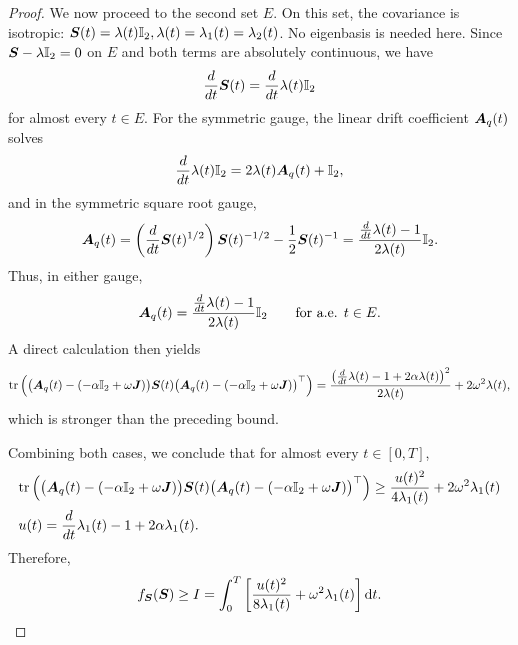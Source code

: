 \begin{proof}
We now proceed to the second set $E$. On this set, the covariance is isotropic: $\boldsymbol{S}(t)=\lambda(t)\mathbb{I}_2, \lambda(t) =\lambda_1(t)=\lambda_2(t)$.
No eigenbasis is needed here. Since $\boldsymbol{S}-\lambda \mathbb{I}_2=0$ on $E$ and both terms are absolutely continuous, we have
\begin{equation*}
    \frac{d}{dt}\boldsymbol{S}(t)= \frac{d}{dt}\lambda(t)\mathbb{I}_2
\end{equation*}
for almost every $t\in E$. For the symmetric gauge, the linear drift coefficient $\boldsymbol{A}_q(t)$ solves
\begin{equation*}
    \frac{d}{dt}\lambda(t)\mathbb{I}_2 = 2\lambda(t)\boldsymbol{A}_q(t)+\mathbb{I}_2,
\end{equation*}
and in the symmetric square root gauge,
\begin{equation*}
    \boldsymbol{A}_q(t)
    =
    \left(\frac{d}{dt}\boldsymbol{S}(t)^{1/2} \right)\boldsymbol{S}(t)^{-1/2} - \frac{1}{2}\boldsymbol{S}(t)^{-1}
    =
    \frac{\frac{d}{dt} \lambda(t) - 1}{2\lambda(t)}\mathbb{I}_2.
\end{equation*}
Thus, in either gauge,
\begin{equation*}
   \boldsymbol{A}_q(t) = \frac{\frac{d}{dt} \lambda(t) - 1}{2\lambda(t)}\mathbb{I}_2
    \qquad\text{for a.e. }t\in E.
\end{equation*}
A direct calculation then yields
\begin{equation*}
\begin{aligned}
    \mathrm{tr} \left(
        \big(\boldsymbol{A}_q(t) - (-\alpha \mathbb{I}_2+\omega \boldsymbol{J})\big)
        \boldsymbol{S}(t)
        \big(\boldsymbol{A}_q(t) - (-\alpha \mathbb{I}_2+\omega \boldsymbol{J})\big)^\top
    \right)
    =
    \frac{\big(\frac{d}{dt} \lambda(t) -1+2\alpha \lambda(t)\big)^2}{2\lambda(t)}
    +
    2\omega^2\lambda(t),
\end{aligned}
\end{equation*}
which is stronger than the preceding bound.

Combining both cases, we conclude that for almost every $t\in[0,T]$,
\begin{equation*}
\begin{aligned}
    &\mathrm{tr}\left(
        \big(\boldsymbol{A}_q(t)-(-\alpha \mathbb{I}_2+\omega \boldsymbol{J})\big)
        \boldsymbol{S}(t)
        \big(\boldsymbol{A}_q(t)-(-\alpha \mathbb{I}_2+\omega \boldsymbol{J})\big)^\top
    \right)
    \geq
    \frac{u(t)^2}{4\lambda_1(t)} + 2\omega^2\lambda_1(t)\\    &u(t) = \frac{d}{dt}\lambda_1(t)-1+2\alpha \lambda_1(t).
\end{aligned}
\end{equation*}
Therefore,
\begin{equation*}
    f_{\boldsymbol{S}}(\boldsymbol{S})
    \geq
    I
    =
    \int_0^{T}
    \left[
        \frac{u(t)^2}{8\lambda_1(t)}
        +
        \omega^2\lambda_1(t)
    \right]\mathop{}\!\mathrm{d} t.
\end{equation*}


\end{proof}
